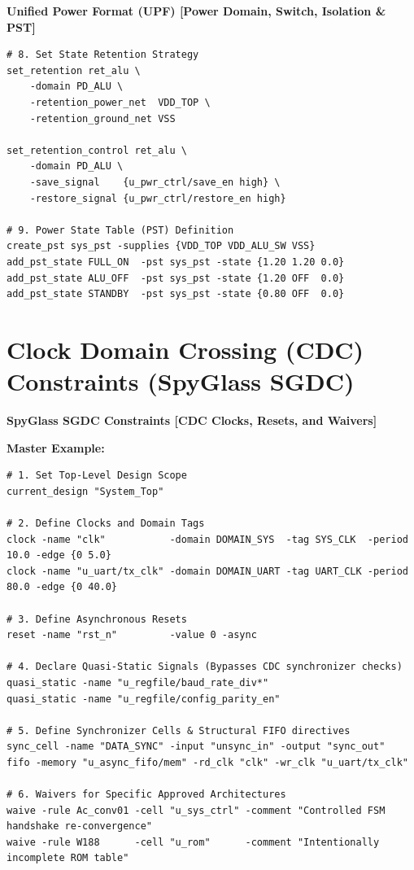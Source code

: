 \documentclass[11pt,a4paper]{article}
\newenvironment{cmdbox}[2]{%
  \begin{mdframed}[style=cmdstyle]%
  {\bfseries\sffamily\color{primary}#1 \hfill \footnotesize\color{mutedgray}[#2]}\par\vspace{3pt}%
}{%
  \end{mdframed}%
}
\begin{document}
\begin{cmdbox}{Unified Power Format (UPF)}{Power Domain, Switch, Isolation \& PST}
\begin{lstlisting}[style=upfstyle]
# 8. Set State Retention Strategy
set_retention ret_alu \
    -domain PD_ALU \
    -retention_power_net  VDD_TOP \
    -retention_ground_net VSS

set_retention_control ret_alu \
    -domain PD_ALU \
    -save_signal    {u_pwr_ctrl/save_en high} \
    -restore_signal {u_pwr_ctrl/restore_en high}

# 9. Power State Table (PST) Definition
create_pst sys_pst -supplies {VDD_TOP VDD_ALU_SW VSS}
add_pst_state FULL_ON  -pst sys_pst -state {1.20 1.20 0.0}
add_pst_state ALU_OFF  -pst sys_pst -state {1.20 OFF  0.0}
add_pst_state STANDBY  -pst sys_pst -state {0.80 OFF  0.0}
\end{lstlisting}
\end{cmdbox}

\section{Clock Domain Crossing (CDC) Constraints (SpyGlass SGDC)}

\begin{cmdbox}{SpyGlass SGDC Constraints}{CDC Clocks, Resets, and Waivers}
\textbf{Master Example:}
\begin{lstlisting}[style=sgdcstyle]
# 1. Set Top-Level Design Scope
current_design "System_Top"

# 2. Define Clocks and Domain Tags
clock -name "clk"           -domain DOMAIN_SYS  -tag SYS_CLK  -period 10.0 -edge {0 5.0}
clock -name "u_uart/tx_clk" -domain DOMAIN_UART -tag UART_CLK -period 80.0 -edge {0 40.0}

# 3. Define Asynchronous Resets
reset -name "rst_n"         -value 0 -async

# 4. Declare Quasi-Static Signals (Bypasses CDC synchronizer checks)
quasi_static -name "u_regfile/baud_rate_div*"
quasi_static -name "u_regfile/config_parity_en"

# 5. Define Synchronizer Cells & Structural FIFO directives
sync_cell -name "DATA_SYNC" -input "unsync_in" -output "sync_out"
fifo -memory "u_async_fifo/mem" -rd_clk "clk" -wr_clk "u_uart/tx_clk"

# 6. Waivers for Specific Approved Architectures
waive -rule Ac_conv01 -cell "u_sys_ctrl" -comment "Controlled FSM handshake re-convergence"
waive -rule W188      -cell "u_rom"      -comment "Intentionally incomplete ROM table"
\end{lstlisting}
\end{cmdbox}
\end{document}

